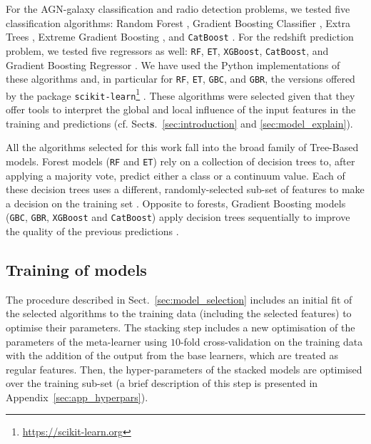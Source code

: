\documentclass{aa}
\begin{document}
For the AGN-galaxy classification and radio detection problems, we tested five classification algorithms: Random Forest \citep[\texttt{RF};][]{Breiman2001}, Gradient Boosting Classifier \citep[\texttt{GBC};][]{10.1214/aos/1013203451}, Extra Trees \citep[\texttt{ET};][]{Geurts2006}, Extreme Gradient Boosting \citep[\texttt{XGBoost}, \texttt{v1.5.1};][]{Chen:2016:XST:2939672.2939785}, and \texttt{CatBoost} \citep[\texttt{v1.0.5};][]{DBLP:journals/corr/DorogushGGKPV17, DBLP:journals/corr/abs-1810-11363}.
For the redshift prediction problem, we tested five regressors as well: \texttt{RF}, \texttt{ET}, \texttt{XGBoost}, \texttt{CatBoost}, and Gradient Boosting Regressor \citep[\texttt{GBR};][]{10.1214/aos/1013203451}.
We have used the Python implementations of these algorithms and, in particular for \texttt{RF}, \texttt{ET}, \texttt{GBC}, and \texttt{GBR}, the versions offered by the package \texttt{scikit-learn}\footnote{\url{https://scikit-learn.org}} \citep[\texttt{v0.23.2};][]{scikit-learn}. These algorithms were selected given that they offer tools to interpret the global and local influence of the input features in the training and predictions (cf. Sect\textbf{s}.~\ref{sec:introduction} and \ref{sec:model_explain}).

All the algorithms selected for this work fall into the broad family of Tree-Based models. Forest models (\texttt{RF} and \texttt{ET}) rely on a collection of decision trees to, after applying a majority vote, predict either a class or a continuum value. Each of these decision trees uses a different, randomly-selected sub-set of features to make a decision on the training set \citep{Breiman2001}. Opposite to forests, Gradient Boosting models (\texttt{GBC}, \texttt{GBR}, \texttt{XGBoost} and \texttt{CatBoost}) apply decision trees sequentially to improve the quality of the previous predictions \citep{10.1214/aos/1013203451, FRIEDMAN2002367}.

\subsection{Training of models}\label{sec:models_training}

The procedure described in Sect.~\ref{sec:model_selection} includes an initial fit of the selected algorithms to the training data (including the selected features) to optimise their parameters. The stacking step includes a new optimisation of the parameters of the meta-learner using $10$-fold cross-validation on the training data with the addition of the output from the base learners, which are treated as regular features. Then, the hyper-parameters of the stacked models are optimised over the training sub-set (a brief description of this step is presented in Appendix~\ref{sec:app_hyperpars}).
\end{document}
